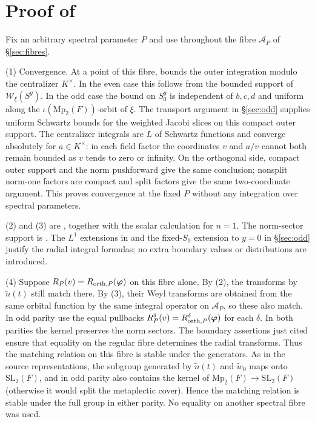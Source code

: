 \documentclass[11pt,oneside,notitlepage]{book}
\numberwithin{equation}{section}
\theoremstyle{plain}
\theoremstyle{definition}
\newcommand{\SL}{\mathrm{SL}}
\newcommand{\Mp}{\mathrm{Mp}}
\newcommand{\cW}{\mathcal{W}}
\begin{document}
\section{Proof of \texorpdfstring{}{the Fourier compatibility theorem}}\label{sec:proof-fourier}

Fix an arbitrary spectral parameter $P$ and use throughout the fibre $\mathcal A_P$ of \S\ref{sec:fibres}.

(1) Convergence. At a point of this fibre,  bounds the outer integration modulo the centralizer $K^\times$. In the even case this follows from the bounded support of $\cW_\xi(S^g)$. In the odd case the bound on $S_0^g$ is independent of $b,c,d$ and uniform along the $\iota(\Mp_2(F))$-orbit of $\xi$. The transport argument in \S\ref{sec:odd} supplies uniform Schwartz bounds for the weighted Jacobi slices on this compact outer support. The centralizer integrals are $L$ of Schwartz functions and converge absolutely for $a\in K^\times$: in each field factor the coordinates $v$ and $a/v$ cannot both remain bounded as $v$ tends to zero or infinity. On the orthogonal side, compact outer support and the norm pushforward give the same conclusion; nonsplit norm-one factors are compact and split factors give the same two-coordinate argument. This proves convergence at the fixed $P$ without any integration over spectral parameters.

(2) and (3) are , together with the scalar calculation for $n=1$. The norm-sector support is . The $L^1$ extensions in  and the fixed-$S_0$ extension to $y=0$ in \S\ref{sec:odd} justify the radial integral formulas; no extra boundary values or distributions are introduced.

(4) Suppose $R_P(v)=R_{{\rm orth},P}(\boldsymbol\varphi)$ on this fibre alone. By (2), the transforms by $\tilde n(t)$ still match there. By (3), their Weyl transforms are obtained from the same orbital function by the same integral operator on $\mathcal A_P$, so these also match. In odd parity use the equal pullbacks $R_P^\delta(v)=R_{{\rm orth},P}^\delta(\boldsymbol\varphi)$ for each $\delta$. In both parities the kernel preserves the norm sectors. The boundary assertions just cited ensure that equality on the regular fibre determines the radial transforms. Thus the matching relation on this fibre is stable under the generators. As in the source representations, the subgroup generated by $\tilde n(t)$ and $\tilde w_0$ maps onto $\SL_2(F)$, and in odd parity also contains the kernel of $\Mp_2(F)\to\SL_2(F)$ (otherwise it would split the metaplectic cover). Hence the matching relation is stable under the full group in either parity. No equality on another spectral fibre was used.
\end{document}
